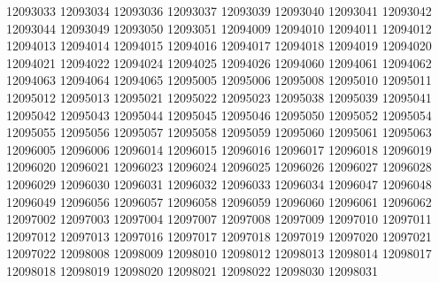 \documentclass[12pt]{article}
\begin{document}
12093033
12093034
12093036
12093037
12093039
12093040
12093041
12093042
12093044
12093049
12093050
12093051
12094009
12094010
12094011
12094012
12094013
12094014
12094015
12094016
12094017
12094018
12094019
12094020
12094021
12094022
12094024
12094025
12094026
12094060
12094061
12094062
12094063
12094064
12094065
12095005
12095006
12095008
12095010
12095011
12095012
12095013
12095021
12095022
12095023
12095038
12095039
12095041
12095042
12095043
12095044
12095045
12095046
12095050
12095052
12095054
12095055
12095056
12095057
12095058
12095059
12095060
12095061
12095063
12096005
12096006
12096014
12096015
12096016
12096017
12096018
12096019
12096020
12096021
12096023
12096024
12096025
12096026
12096027
12096028
12096029
12096030
12096031
12096032
12096033
12096034
12096047
12096048
12096049
12096056
12096057
12096058
12096059
12096060
12096061
12096062
12097002
12097003
12097004
12097007
12097008
12097009
12097010
12097011
12097012
12097013
12097016
12097017
12097018
12097019
12097020
12097021
12097022
12098008
12098009
12098010
12098012
12098013
12098014
12098017
12098018
12098019
12098020
12098021
12098022
12098030
12098031



\newpage
\end{document}
